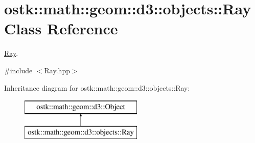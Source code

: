 \hypertarget{classostk_1_1math_1_1geom_1_1d3_1_1objects_1_1_ray}{}\section{ostk\+:\+:math\+:\+:geom\+:\+:d3\+:\+:objects\+:\+:Ray Class Reference}
\label{classostk_1_1math_1_1geom_1_1d3_1_1objects_1_1_ray}


\hyperlink{classostk_1_1math_1_1geom_1_1d3_1_1objects_1_1_ray}{Ray}.  




{\ttfamily \#include $<$Ray.\+hpp$>$}

Inheritance diagram for ostk\+:\+:math\+:\+:geom\+:\+:d3\+:\+:objects\+:\+:Ray\+:\begin{figure}[H]
\begin{center}
\leavevmode
\includegraphics[height=2.000000cm]{classostk_1_1math_1_1geom_1_1d3_1_1objects_1_1_ray}
\end{center}
\end{figure}
